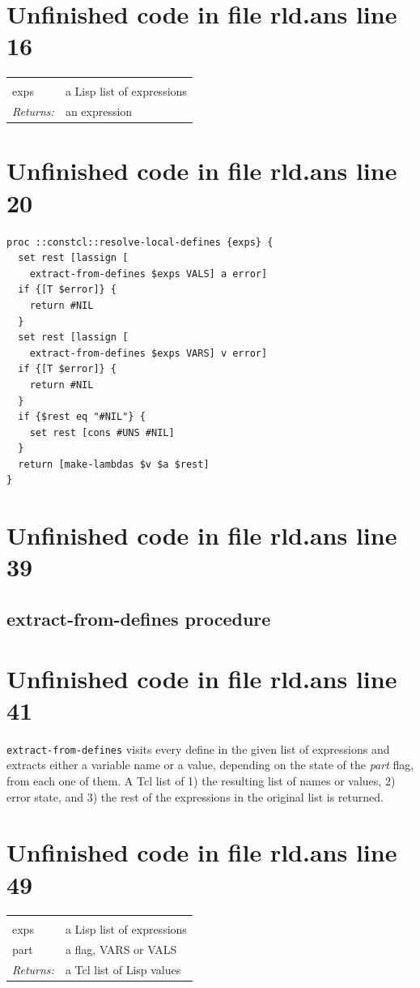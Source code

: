 \documentclass[twoside,9pt]{report}
\begin{document}
\section{Unfinished code in file rld.ans line 16}
\noindent\begin{tabular}{ |p{1.9cm} p{8cm}| }
\hline
\rowcolor[HTML]{CCCCCC} \multicolumn{2}{|l|}{\bf resolve-local-defines} \\
exps & a Lisp list of expressions \\
\textit{Returns:} & an expression \\
\hline
\end{tabular}
\section{Unfinished code in file rld.ans line 20}
\begin{lstlisting}
proc ::constcl::resolve-local-defines {exps} {
  set rest [lassign [
    extract-from-defines $exps VALS] a error]
  if {[T $error]} {
    return #NIL
  }
  set rest [lassign [
    extract-from-defines $exps VARS] v error]
  if {[T $error]} {
    return #NIL
  }
  if {$rest eq "#NIL"} {
    set rest [cons #UNS #NIL]
  }
  return [make-lambdas $v $a $rest]
}
\end{lstlisting}
\section{Unfinished code in file rld.ans line 39}
\subsection{extract-from-defines procedure}
\label{extract-from-defines-procedure}
\section{Unfinished code in file rld.ans line 41}


\texttt{extract-from-defines} visits every define in the given list of expressions and extracts either a variable name or a value, depending on the state of the \emph{part} flag, from each one of them. A Tcl list of 1) the resulting list of names or values, 2) error state, and 3) the rest of the expressions in the original list is returned.

\section{Unfinished code in file rld.ans line 49}
\noindent\begin{tabular}{ |p{1.9cm} p{8cm}| }
\hline
\rowcolor[HTML]{CCCCCC} \multicolumn{2}{|l|}{\bf extract-from-defines (internal)} \\
exps & a Lisp list of expressions \\
part & a flag, VARS or VALS \\
\textit{Returns:} & a Tcl list of Lisp values \\
\hline
\end{tabular}
\end{document}
